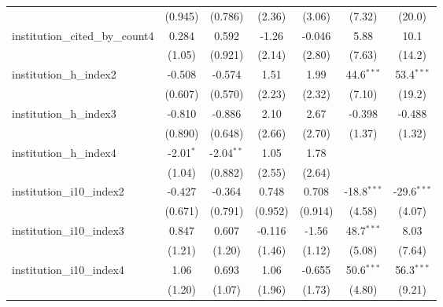 \begin{tabular}{lcccccc}
                                         & (0.945)       & (0.786)       & (2.36)        & (3.06)        & (7.32)        & (20.0)\\   
   institution\_cited\_by\_count4        & 0.284         & 0.592         & -1.26         & -0.046        & 5.88          & 10.1\\   
                                         & (1.05)        & (0.921)       & (2.14)        & (2.80)        & (7.63)        & (14.2)\\   
   institution\_h\_index2                & -0.508        & -0.574        & 1.51          & 1.99          & 44.6$^{***}$  & 53.4$^{***}$\\   
                                         & (0.607)       & (0.570)       & (2.23)        & (2.32)        & (7.10)        & (19.2)\\   
   institution\_h\_index3                & -0.810        & -0.886        & 2.10          & 2.67          & -0.398        & -0.488\\   
                                         & (0.890)       & (0.648)       & (2.66)        & (2.70)        & (1.37)        & (1.32)\\   
   institution\_h\_index4                & -2.01$^{*}$   & -2.04$^{**}$  & 1.05          & 1.78          &               &   \\   
                                         & (1.04)        & (0.882)       & (2.55)        & (2.64)        &               &   \\   
   institution\_i10\_index2              & -0.427        & -0.364        & 0.748         & 0.708         & -18.8$^{***}$ & -29.6$^{***}$\\   
                                         & (0.671)       & (0.791)       & (0.952)       & (0.914)       & (4.58)        & (4.07)\\   
   institution\_i10\_index3              & 0.847         & 0.607         & -0.116        & -1.56         & 48.7$^{***}$  & 8.03\\   
                                         & (1.21)        & (1.20)        & (1.46)        & (1.12)        & (5.08)        & (7.64)\\   
   institution\_i10\_index4              & 1.06          & 0.693         & 1.06          & -0.655        & 50.6$^{***}$  & 56.3$^{***}$\\   
                                         & (1.20)        & (1.07)        & (1.96)        & (1.73)        & (4.80)        & (9.21)\\   

\end{tabular}
